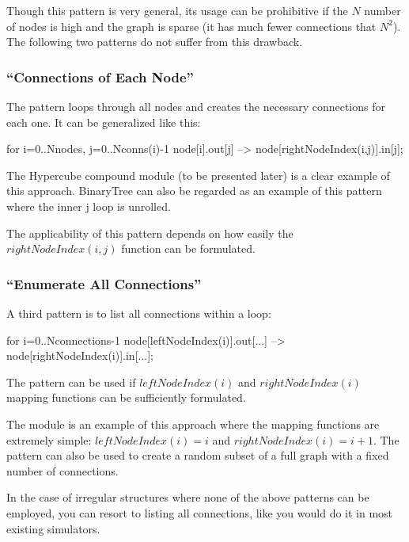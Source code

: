 Though this pattern is very general, its usage can be prohibitive if
the $N$ number of nodes is high and the graph is sparse (it has
much fewer connections that $N^2$). The following
two patterns do not suffer from this drawback.


\subsubsection{``Connections of Each Node''}

The pattern loops through all nodes and creates the necessary
connections for each one. It can be generalized like this:

\begin{ned}
for i=0..Nnodes, j=0..Nconns(i)-1 {
    node[i].out[j] --> node[rightNodeIndex(i,j)].in[j];
}
\end{ned}

The Hypercube compound module (to be
presented later) is a clear example of this approach. BinaryTree can
also be regarded as an example of this pattern where the inner j loop
is unrolled.

The applicability of this pattern depends on how easily the $rightNodeIndex(i,j)$
function can be formulated.


\subsubsection{``Enumerate All Connections''}


A third pattern is to list all connections within a loop:

\begin{ned}
for i=0..Nconnections-1 {
    node[leftNodeIndex(i)].out[...] --> node[rightNodeIndex(i)].in[...];
}
\end{ned}

The pattern can be used if $leftNodeIndex(i)$ and $rightNodeIndex(i)$
mapping functions can be sufficiently formulated.

The  module is an example of this approach where the mapping
functions are extremely simple: $leftNodeIndex(i)=i$ and $rightNodeIndex(i) = i+1$.
The pattern can also be used to create a random subset of a full
graph with a fixed number of connections.

In the case of irregular structures where none of the above patterns
can be employed, you can resort to listing all connections, like you
would do it in most existing simulators.




